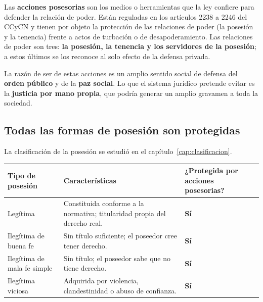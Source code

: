 \documentclass[12pt,oneside]{book}
\begin{document}
Las \textbf{acciones posesorias} son los medios o herramientas que la ley confiere para defender la relación de poder. Están reguladas en los artículos 2238 a 2246 del CCyCN y tienen por objeto la protección de las relaciones de poder (la posesión y la tenencia) frente a actos de turbación o de desapoderamiento. Las relaciones de poder son tres: \textbf{la posesión, la tenencia y los servidores de la posesión}; a estos últimos se los reconoce al solo efecto de la defensa privada.

La razón de ser de estas acciones es un amplio sentido social de defensa del \textbf{orden público} y de la \textbf{paz social}. Lo que el sistema jurídico pretende evitar es la \textbf{justicia por mano propia}, que podría generar un amplio gravamen a toda la sociedad.

\subsection{Todas las formas de posesión son protegidas}

La clasificación de la posesión se estudió en el capítulo~\ref{cap:clasificacion}.


\begin{table}[H]
\centering
\begin{tabularx}{\textwidth}{@{}>{\raggedright\arraybackslash}p{}>{\raggedright\arraybackslash}X>{\centering\arraybackslash}p{}@{}}
\toprule
\textbf{Tipo de posesión} & \textbf{Características} & \textbf{¿Protegida por acciones posesorias?} \\
\midrule
Legítima & Constituida conforme a la normativa; titularidad propia del derecho real. & \textbf{Sí} \\
Ilegítima de buena fe & Sin título suficiente; el poseedor cree tener derecho. & \textbf{Sí} \\
Ilegítima de mala fe simple & Sin título; el poseedor sabe que no tiene derecho. & \textbf{Sí} \\
Ilegítima viciosa & Adquirida por violencia, clandestinidad o abuso de confianza. & \textbf{Sí} \\
\bottomrule
\end{tabularx}
\end{table}
\end{document}
